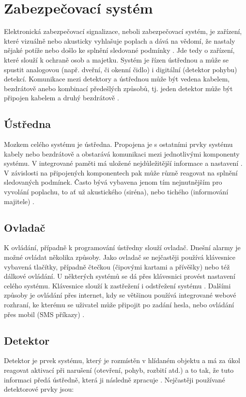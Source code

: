 \documentclass[FM,DP]{tulthesis}  %
\begin{document}

\section{Zabezpečovací systém}
Elektronická zabezpečovací signalizace, neboli zabezpečovací systém, je zařízení, které vizuálně nebo akusticky vyhlašuje poplach a dává na vědomí, že nastaly nějaké potíže nebo došlo ke splnění sledované podmínky \cite{Security alarm}. Jde tedy o zařízení, které slouží k ochraně osob a majetku. Systém je řízen ústřednou a může se spustit analogovou (např. dveřní, či okenní čidlo) i digitální (detektor pohybu) detekcí. Komunikace mezi detektory a ústřednou může být vedena kabelem, bezdrátově anebo kombinací předešlých způsobů, tj. jeden detektor může být připojen kabelem a druhý bezdrátově \cite{Electronic security system}.

\subsection{Ústředna}
Mozkem celého systému je ústředna. Propojena je s ostatními prvky systému kabely nebo bezdrátově a obstarává komunikaci mezi jednotlivými komponenty systému. V integrované paměti má uložené nejdůležitější informace a nastavení \cite{Electronic security system}. V závislosti na připojených komponentech pak může různě reagovat na splnění sledovaných podmínek. Často bývá vybavena jenom tím nejnutnějším pro vyvolání poplachu, to ať už akustického (siréna), nebo tichého (informování majitele) \cite{Security alarm}.

\subsection{Ovladač}
K ovládání, případně k programování ústředny slouží ovladač. Dnešní alarmy je možné ovládat několika způsoby. Jako ovladač se nejčastěji používá klávesnice vybavená tlačítky, případně čtečkou (čipovými kartami a přívěšky) nebo též dálkové ovládání. U některých systémů se dá přes klávesnici provést nastavení celého systému. Klávesnice slouží k zastřežení i odstřežení systému \cite{Electronic security signalisation}. Dalšími způsoby je ovládání přes internet, kdy se většinou používá integrované webové rozhraní, ke kterému se uživatel může připojit po zadání hesla, nebo ovládání přes mobil (SMS příkazy) \cite{Bachelor thesis}.

\subsection{Detektor}
Detektor je prvek systému, který je rozmístěn v hlídaném objektu a má za úkol reagovat aktivací při narušení (otevření, pohyb, rozbití atd.) a to tak, že tuto informaci předá ústředně, která ji následně zpracuje \cite{Electronic security signalisation}. Nejčastěji používané detektorové prvky jsou:
\end{document}
